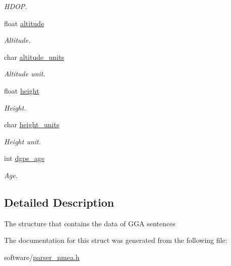 \begin{DoxyCompactItemize}
\begin{DoxyCompactList}\small\item\em H\+D\+OP. \end{DoxyCompactList}\item 
float \hyperlink{structnmea__sentence__gga_a0e13a4b4ae0cefdac2a413284239caa6}{altitude}\hypertarget{structnmea__sentence__gga_a0e13a4b4ae0cefdac2a413284239caa6}{}\label{structnmea__sentence__gga_a0e13a4b4ae0cefdac2a413284239caa6}

\begin{DoxyCompactList}\small\item\em Altitude. \end{DoxyCompactList}\item 
char \hyperlink{structnmea__sentence__gga_a7166b52e8913d6d4dd40e8c161954552}{altitude\+\_\+units}\hypertarget{structnmea__sentence__gga_a7166b52e8913d6d4dd40e8c161954552}{}\label{structnmea__sentence__gga_a7166b52e8913d6d4dd40e8c161954552}

\begin{DoxyCompactList}\small\item\em Altitude unit. \end{DoxyCompactList}\item 
float \hyperlink{structnmea__sentence__gga_a48083b65ac9a863566dc3e3fff09a5b4}{height}\hypertarget{structnmea__sentence__gga_a48083b65ac9a863566dc3e3fff09a5b4}{}\label{structnmea__sentence__gga_a48083b65ac9a863566dc3e3fff09a5b4}

\begin{DoxyCompactList}\small\item\em Height. \end{DoxyCompactList}\item 
char \hyperlink{structnmea__sentence__gga_abe8e77aaa06b9f9485259ede3bd47148}{height\+\_\+units}\hypertarget{structnmea__sentence__gga_abe8e77aaa06b9f9485259ede3bd47148}{}\label{structnmea__sentence__gga_abe8e77aaa06b9f9485259ede3bd47148}

\begin{DoxyCompactList}\small\item\em Height unit. \end{DoxyCompactList}\item 
int \hyperlink{structnmea__sentence__gga_afb452cdc55614cf7fe9630b9e7e1c412}{dgps\+\_\+age}\hypertarget{structnmea__sentence__gga_afb452cdc55614cf7fe9630b9e7e1c412}{}\label{structnmea__sentence__gga_afb452cdc55614cf7fe9630b9e7e1c412}

\begin{DoxyCompactList}\small\item\em Age. \end{DoxyCompactList}\end{DoxyCompactItemize}


\subsection{Detailed Description}
The structure that contains the data of G\+GA sentences 

The documentation for this struct was generated from the following file\+:\begin{DoxyCompactItemize}
\item 
software/\hyperlink{parser__nmea_8h}{parser\+\_\+nmea.\+h}\end{DoxyCompactItemize}
